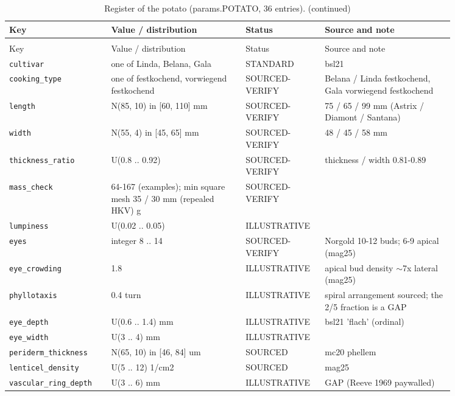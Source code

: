 \documentclass[10.5pt,a4paper]{article}
\begin{document}
{\scriptsize\begin{longtable}{@{}p{0.2\linewidth}p{0.27\linewidth}p{0.12\linewidth}p{0.26\linewidth}@{}}\caption{Register of the potato (params.POTATO, 36 entries).}\\\toprule Key & Value / distribution & Status & Source and note \\\midrule\endfirsthead
\caption[]{Register of the potato (params.POTATO, 36 entries). (continued)}\\\toprule Key & Value / distribution & Status & Source and note \\\midrule\endhead
\texttt{cultivar} & one of Linda, Belana, Gala & STANDARD & bsl21 \\
\texttt{cooking\_\allowbreak{}type} & one of festkochend, vorwiegend festkochend & SOURCED-VERIFY & Belana / Linda festkochend, Gala vorwiegend festkochend \\
\texttt{length} & N(85, 10) in [60, 110] mm & SOURCED-VERIFY & 75 / 65 / 99 mm (Astrix / Diamont / Santana) \\
\texttt{width} & N(55, 4) in [45, 65] mm & SOURCED-VERIFY & 48 / 45 / 58 mm \\
\texttt{thickness\_\allowbreak{}ratio} & U(0.8 .. 0.92) & SOURCED-VERIFY & thickness / width 0.81-0.89 \\
\texttt{mass\_\allowbreak{}check} & 64-167 (examples); min square mesh 35 / 30 mm (repealed HKV) g & SOURCED-VERIFY &  \\
\texttt{lumpiness} & U(0.02 .. 0.05) & ILLUSTRATIVE &  \\
\texttt{eyes} & integer 8 .. 14 & SOURCED-VERIFY & Norgold 10-12 buds; 6-9 apical (mag25) \\
\texttt{eye\_\allowbreak{}crowding} & 1.8 & ILLUSTRATIVE & apical bud density $\sim$7x lateral (mag25) \\
\texttt{phyllotaxis} & 0.4 turn & ILLUSTRATIVE & spiral arrangement sourced; the 2/5 fraction is a GAP \\
\texttt{eye\_\allowbreak{}depth} & U(0.6 .. 1.4) mm & ILLUSTRATIVE & bsl21 'flach' (ordinal) \\
\texttt{eye\_\allowbreak{}width} & U(3 .. 4) mm & ILLUSTRATIVE &  \\
\texttt{periderm\_\allowbreak{}thickness} & N(65, 10) in [46, 84] um & SOURCED & mc20 phellem \\
\texttt{lenticel\_\allowbreak{}density} & U(5 .. 12) 1/cm2 & SOURCED & mag25 \\
\texttt{vascular\_\allowbreak{}ring\_\allowbreak{}depth} & U(3 .. 6) mm & ILLUSTRATIVE & GAP (Reeve 1969 paywalled) \\

\end{longtable}}
\end{document}
